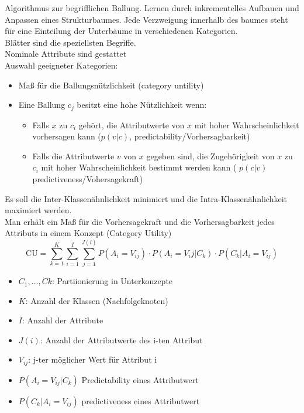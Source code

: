 Algorithmus zur begrifflichen Ballung. Lernen durch inkrementelles Aufbauen und
Anpassen eines Strukturbaumes. Jede Verzweigung innerhalb des baumes steht für
 eine Einteilung der Unterbäume in verschiedenen Kategorien.\\
 Blätter sind die speziellsten Begriffe.\\Nominale Attribute sind gestattet\\
Auswahl geeigneter Kategorien:
\begin{itemize}
    \item Maß für die Ballungsnützlichkeit (category untility)
    \item Eine Ballung $c_j$ besitzt eine hohe Nützlichkeit wenn:
    \begin{itemize}
        \item Falls $x$ zu $c_i$ gehört, die Attributwerte von $x$ mit hoher
        Wahrscheinlichkeit vorhersagen kann ($p(v|c)$, predictability/Vorhersagbarkeit)
        \item Falls die Attributwerte $v$ von $x$ gegeben sind, die Zugehörigkeit
        von $x$ zu $c_i$ mit hoher Wahrscheinlichkeit bestimmt werden kann (
        $p(c|v)$ predictiveness/Vohersagekraft)
    \end{itemize}
\end{itemize}
Es soll die Inter-Klassenähnlichkeit minimiert und die Intra-Klassenähnlichkeit
maximiert werden.\\
Man erhält ein Maß für die Vorhersagekraft und die Vorhersagbarkeit jedes
Attributs in einem Konzept (Category Utility)
\begin{displaymath}
    \text{CU} = \sum_{k=1}^K \sum_{i=1}^I \sum_{j=1}^{J(i)} P(A_i = V_{ij}) \cdot P(A_i = V_ij | C_k) \cdot P(C_k | A_i = V_{ij})
\end{displaymath}
\begin{itemize}
    \item $C_1,\dots,Ck$: Partiionierung in Unterkonzepte
    \item $K$: Anzahl der Klassen (Nachfolgeknoten)
    \item $I$: Anzahl der Attribute
    \item $J(i)$: Anzahl der Attributwerte des i-ten Attribut
    \item $V_{ij}$: j-ter möglicher Wert für Attribut i
    \item $P(A_i = V_{ij} | C_k)$ Predictability eines Attributwert
    \item $P(C_k | A_i = V_{ij})$ predictiveness eines Attributwert
\end{itemize}
